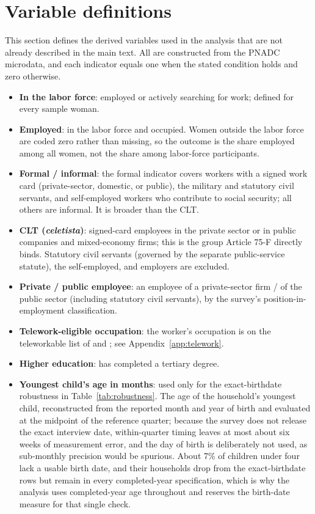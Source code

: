 

\clearpage
\section{Variable definitions}\label{app:variables}

This section defines the derived variables used in the analysis that are not already described in the main text. All are constructed from the PNADC microdata, and each indicator equals one when the stated condition holds and zero otherwise.

\begin{itemize}
\item \textbf{In the labor force}: employed or actively searching for work; defined for every sample woman.
\item \textbf{Employed}: in the labor force and occupied. Women outside the labor force are coded zero rather than missing, so the outcome is the share employed among all women, not the share among labor-force participants.
\item \textbf{Formal / informal}: the formal indicator covers workers with a signed work card (private-sector, domestic, or public), the military and statutory civil servants, and self-employed workers who contribute to social security; all others are informal. It is broader than the CLT.
\item \textbf{CLT (\emph{celetista})}: signed-card employees in the private sector or in public companies and mixed-economy firms; this is the group Article 75-F directly binds. Statutory civil servants (governed by the separate public-service statute), the self-employed, and employers are excluded.
\item \textbf{Private / public employee}: an employee of a private-sector firm / of the public sector (including statutory civil servants), by the survey's position-in-employment classification.
\item \textbf{Telework-eligible occupation}: the worker's occupation is on the teleworkable list of \citet{goes2020} and \citet{costa2024}; see Appendix~\ref{app:telework}.
\item \textbf{Higher education}: has completed a tertiary degree.
\item \textbf{Youngest child's age in months}: used only for the exact-birthdate robustness in Table~\ref{tab:robustness}. The age of the household's youngest child, reconstructed from the reported month and year of birth and evaluated at the midpoint of the reference quarter; because the survey does not release the exact interview date, within-quarter timing leaves at most about six weeks of measurement error, and the day of birth is deliberately not used, as sub-monthly precision would be spurious. About 7\% of children under four lack a usable birth date, and their households drop from the exact-birthdate rows but remain in every completed-year specification, which is why the analysis uses completed-year age throughout and reserves the birth-date measure for that single check.
\end{itemize}

